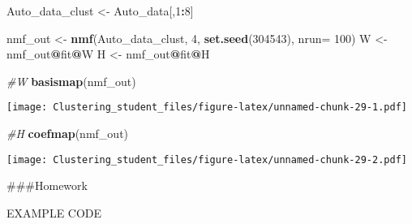 \documentclass[11pt,]{article}
\newenvironment{Shaded}{\begin{snugshade}}{\end{snugshade}}
\newcommand{\CommentTok}[1]{\textcolor[rgb]{0.56,0.35,0.01}{\textit{#1}}}
\newcommand{\DataTypeTok}[1]{\textcolor[rgb]{0.13,0.29,0.53}{#1}}
\newcommand{\DecValTok}[1]{\textcolor[rgb]{0.00,0.00,0.81}{#1}}
\newcommand{\KeywordTok}[1]{\textcolor[rgb]{0.13,0.29,0.53}{\textbf{#1}}}
\newcommand{\NormalTok}[1]{#1}
\newcommand{\OperatorTok}[1]{\textcolor[rgb]{0.81,0.36,0.00}{\textbf{#1}}}
\newcommand{\StringTok}[1]{\textcolor[rgb]{0.31,0.60,0.02}{#1}}
\begin{document}
\begin{Shaded}
\begin{Highlighting}[]
\NormalTok{Auto_data_clust <-}\StringTok{ }\NormalTok{Auto_data[,}\DecValTok{1}\OperatorTok{:}\DecValTok{8}\NormalTok{]}

\NormalTok{nmf_out <-}\StringTok{ }\KeywordTok{nmf}\NormalTok{(Auto_data_clust, }\DecValTok{4}\NormalTok{, }\KeywordTok{set.seed}\NormalTok{(}\DecValTok{304543}\NormalTok{), }\DataTypeTok{nrun=} \DecValTok{100}\NormalTok{)}
\NormalTok{W <-}\StringTok{ }\NormalTok{nmf_out}\OperatorTok{@}\NormalTok{fit}\OperatorTok{@}\NormalTok{W}
\NormalTok{H <-}\StringTok{ }\NormalTok{nmf_out}\OperatorTok{@}\NormalTok{fit}\OperatorTok{@}\NormalTok{H}

\CommentTok{#W}
\KeywordTok{basismap}\NormalTok{(nmf_out)}
\end{Highlighting}
\end{Shaded}

\texttt{[image: Clustering\_student\_files/figure-latex/unnamed-chunk-29-1.pdf]}

\begin{Shaded}
\begin{Highlighting}[]
\CommentTok{#H}
\KeywordTok{coefmap}\NormalTok{(nmf_out)}
\end{Highlighting}
\end{Shaded}

\texttt{[image: Clustering\_student\_files/figure-latex/unnamed-chunk-29-2.pdf]}
\newpage

\#\#\#Homework

EXAMPLE CODE
\end{document}
